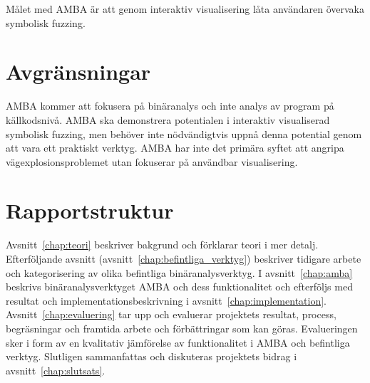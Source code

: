 Målet med AMBA är att genom interaktiv visualisering låta användaren övervaka
symbolisk fuzzing.

\section{Avgränsningar}

AMBA kommer att fokusera på binäranalys och inte analys av program på
källkodsnivå. AMBA ska demonstrera potentialen i interaktiv visualiserad
symbolisk fuzzing, men behöver inte nödvändigtvis uppnå denna potential genom
att vara ett praktiskt verktyg. AMBA har inte det primära syftet att angripa
vägexplosionsproblemet utan fokuserar på användbar visualisering.

\section{Rapportstruktur}

Avsnitt~\ref{chap:teori} beskriver bakgrund och förklarar teori i mer detalj.
Efterföljande avsnitt (avsnitt~\ref{chap:befintliga_verktyg}) beskriver
tidigare arbete och kategorisering av olika befintliga binäranalysverktyg. I
avsnitt~\ref{chap:amba} beskrivs binäranalysverktyget AMBA och dess
funktionalitet och efterföljs med resultat och implementationsbeskrivning i
avsnitt~\ref{chap:implementation}. Avsnitt~\ref{chap:evaluering} tar upp och
evaluerar projektets resultat, process, begräsningar och framtida arbete och
förbättringar som kan göras. Evalueringen sker i form av en kvalitativ
jämförelse av funktionalitet i AMBA och befintliga verktyg. Slutligen
sammanfattas och diskuteras projektets bidrag i avsnitt~\ref{chap:slutsats}.
